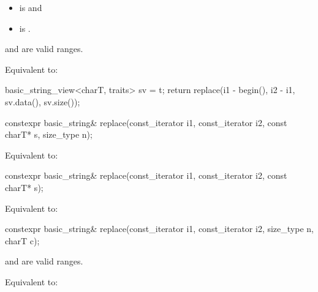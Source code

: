 \begin{itemdescr}
\pnum
\constraints
\begin{itemize}
\item
{} is
 and
\item
{} is
.
\end{itemize}

\pnum
\expects
{} and  are valid ranges.

\pnum
\effects
Equivalent to:
\begin{codeblock}
basic_string_view<charT, traits> sv = t;
return replace(i1 - begin(), i2 - i1, sv.data(), sv.size());
\end{codeblock}
\end{itemdescr}

%
\begin{itemdecl}
constexpr basic_string& replace(const_iterator i1, const_iterator i2, const charT* s, size_type n);
\end{itemdecl}

\begin{itemdescr}
\pnum
\effects
Equivalent to: 
\end{itemdescr}

%
\begin{itemdecl}
constexpr basic_string& replace(const_iterator i1, const_iterator i2, const charT* s);
\end{itemdecl}

\begin{itemdescr}
\pnum
\effects
Equivalent to: 
\end{itemdescr}

%
\begin{itemdecl}
constexpr basic_string& replace(const_iterator i1, const_iterator i2, size_type n, charT c);
\end{itemdecl}

\begin{itemdescr}
\pnum
\expects
{} and  are valid ranges.

\pnum
\effects
Equivalent to: 
\end{itemdescr}

